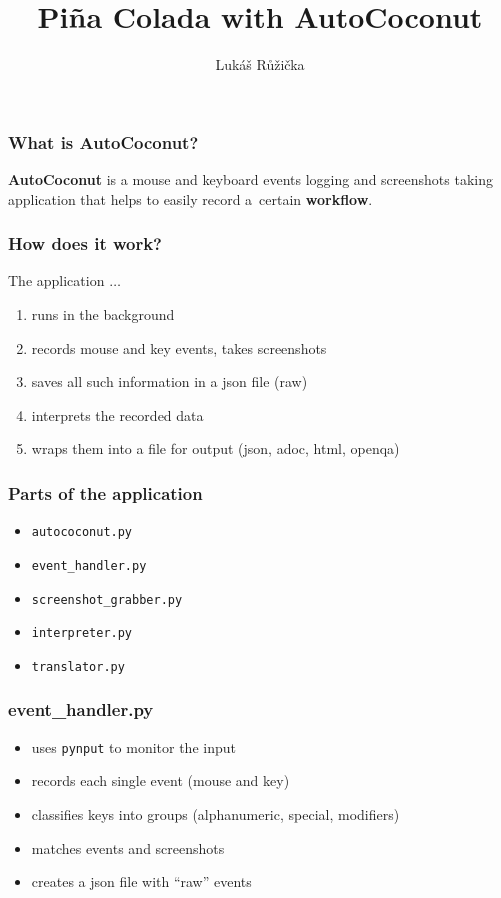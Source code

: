 \documentclass[14pt]{beamer}
\begin{document}
	\author{Lukáš Růžička}
	\title{Pi\~na Colada with AutoCoconut}
	\begin{frame}[plain]
		\maketitle
	\end{frame}
	
	\begin{frame}
		\frametitle{What is AutoCoconut?}
		
		\textbf{AutoCoconut} is a mouse and keyboard events logging and screenshots taking application that helps to easily record a~certain \textbf{workflow}.
	\end{frame} 

\begin{frame}
	\frametitle{How does it work?}
	The application $\ldots$
	\begin{enumerate}
		\item runs in the background
		\item records mouse and key events, takes screenshots
		\item saves all such information in a json file (raw)
		\item interprets the recorded data
		\item wraps them into a file for output (json, adoc, html, openqa)
	\end{enumerate}
\end{frame}

\begin{frame}
	\frametitle{Parts of the application}
	
	\begin{itemize}
		\item \texttt{autococonut.py}		
		\item \texttt{event\_handler.py}
		\item \texttt{screenshot\_grabber.py}
		\item \texttt{interpreter.py}
		\item \texttt{translator.py}
	\end{itemize}
	
\end{frame}

\begin{frame}
	\frametitle{event\_handler.py}
	\begin{itemize}
	\item uses \texttt{pynput} to monitor the input
 	\item records each single event (mouse and key)
	\item classifies keys into groups (alphanumeric, special, modifiers)
	\item matches events and screenshots
	\item creates a json file with ``raw'' events
	\end{itemize}
\end{frame}
\end{document}
